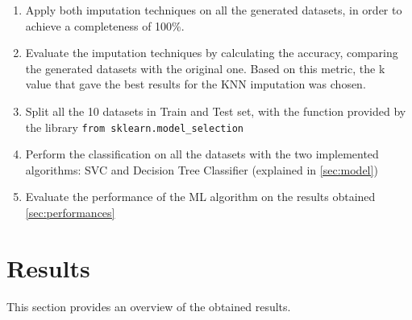 \documentclass{article}
\begin{document}
\begin{enumerate}
    \item Apply both imputation techniques on all the generated datasets, in order to achieve a completeness of 100\%. 
    \item Evaluate the imputation techniques by calculating the accuracy, comparing the generated datasets with the original one. Based on this metric, the k value that gave the best results for the KNN imputation was chosen.
    \item Split all the 10 datasets in Train and Test set, with the function provided by the library \texttt{from sklearn.model\_selection}
    \item Perform the classification on all the datasets with the two implemented algorithms: SVC and Decision Tree Classifier (explained in \ref{sec:model})
    \item Evaluate the performance of the ML algorithm on the results obtained \ref{sec:performances}
\end{enumerate}


\section{Results}
This section provides an overview of the obtained results.
\end{document}
